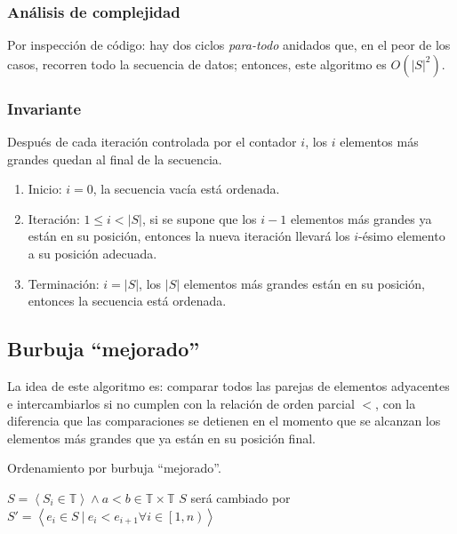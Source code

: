 \documentclass[letter]{article}
\begin{document}
\subsubsection{Análisis de complejidad} \label{algoritmos:inocente:complejidad}

Por inspección de código: hay dos ciclos {\it para-todo} anidados que, en el peor de los casos, recorren todo la secuencia de datos; entonces, este algoritmo es $O(|S|^2)$.

\subsubsection{Invariante} \label{algoritmos:inocente:invariante}

Después de cada iteración controlada por el contador $i$, los $i$ elementos más grandes quedan al final de la secuencia.

\begin{enumerate}
    \item Inicio: $i=0$, la secuencia vacía está ordenada.
    \item Iteración: $1 \le i<|S|$, si se supone que los $i-1$ elementos más grandes ya están en su posición, entonces la nueva iteración llevará los $i$-ésimo elemento a su posición adecuada.
    \item Terminación: $i=|S|$, los $|S|$ elementos más grandes están en su posición, entonces la secuencia está ordenada.
\end{enumerate}

\subsection{Burbuja ``mejorado''} \label{algoritmos:mejorado}

La idea de este algoritmo es: comparar todos las parejas de elementos adyacentes e intercambiarlos si no cumplen con la relación de orden parcial $<$, con la diferencia que las comparaciones se detienen en el momento que se alcanzan los elementos más grandes que ya están en su posición final.

\begin{algorithm}[!htb]
\caption{Ordenamiento por burbuja ``mejorado''.}
\begin{algorithmic}[1]
\Require $S=\left< S_i \in \mathbb{T} \right> \land a<b \in \mathbb{T} \times \mathbb{T}$
\Ensure $S$ será cambiado por $S' = \left< e_i \in S  ~ | ~ e_i < e_{i+1} \forall i \in \left[1,n\right)\right>$
     
        \State {}
      \EndIf
    \EndFor
  \EndFor
\EndProcedure
\end{algorithmic}
\end{algorithm}
\end{document}
